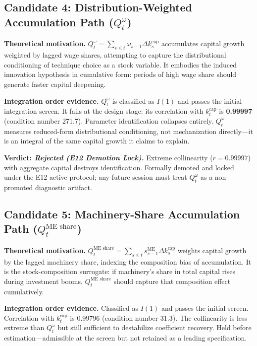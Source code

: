 \documentclass[11pt,a4paper]{article}
\begin{document}
\subsection{Candidate 4: Distribution-Weighted Accumulation Path ($Q_t^\omega$)}

\textbf{Theoretical motivation.} $Q_t^\omega = \sum_{s \le t} \omega_{s-1} \Delta k_s^{\text{cap}}$ accumulates capital growth weighted by lagged wage shares, attempting to capture the distributional conditioning of technique choice as a stock variable. It embodies the induced innovation hypothesis in cumulative form: periods of high wage share should generate faster capital deepening.

\textbf{Integration order evidence.} $Q_t^\omega$ is classified as $I(1)$ and passes the initial integration screen. It fails at the design stage: its correlation with $k_t^{\text{cap}}$ is \textbf{0.99997} (condition number 271.7). Parameter identification collapses entirely. $Q_t^\omega$ measures reduced-form distributional conditioning, not mechanization directly---it is an integral of the same capital growth it claims to explain.

\textbf{Verdict: \textit{Rejected (E12 Demotion Lock).}} Extreme collinearity ($r = 0.99997$) with aggregate capital destroys identification. Formally demoted and locked under the E12 active protocol; any future session must treat $Q_t^\omega$ as a non-promoted diagnostic artifact.

\subsection{Candidate 5: Machinery-Share Accumulation Path ($Q_t^{\text{ME share}}$)}

\textbf{Theoretical motivation.} $Q_t^{\text{ME share}} = \sum_{s \le t} s_{s-1}^{\text{ME}} \Delta k_s^{\text{cap}}$ weights capital growth by the lagged machinery share, indexing the composition bias of accumulation. It is the stock-composition surrogate: if machinery's share in total capital rises during investment booms, $Q_t^{\text{ME share}}$ should capture that composition effect cumulatively.

\textbf{Integration order evidence.} Classified as $I(1)$ and passes the initial screen. Correlation with $k_t^{\text{cap}}$ is 0.99796 (condition number 31.3). The collinearity is less extreme than $Q_t^\omega$ but still sufficient to destabilize coefficient recovery. Held before estimation---admissible at the screen but not retained as a leading specification.
\end{document}
